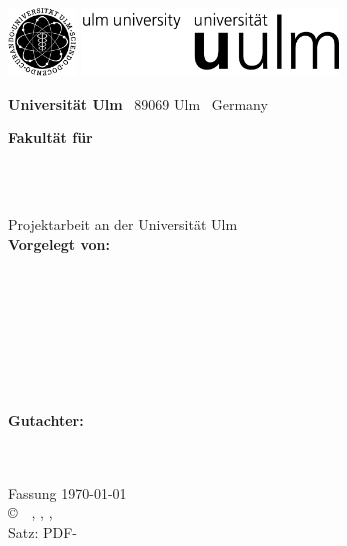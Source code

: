 \frontmatter

\thispagestyle{empty}
\begin{addmargin*}[4mm]{-1mm}
	
	\includegraphics[height=1.8cm]{images/unilogo_bild}
	\hspace*{52.5mm}
	\includegraphics[height=1.8cm]{images/unilogo_wort}\\[1em]
	
	{\footnotesize
		{\bfseries Universität Ulm} \textbar ~89069 Ulm \textbar ~Germany
		\hspace*{57mm}\parbox[t]{36mm}{\bfseries Fakultät für 
			\fakultaet\\
			\mdseries \institut}\\[2cm]
		
		\parbox{143mm}{\bfseries \LARGE \titel}\\[2em]
		{\footnotesize Projektarbeit an der Universität Ulm}\\[2em]
		{\footnotesize \bfseries Vorgelegt von:}\\
		{\footnotesize \fullnameA\\ \emailA}\\[1em]
		{\footnotesize \fullnameB\\ \emailB}\\[1em]
		{\footnotesize \fullnameC\\ \emailC}\\[1em]
		{\footnotesize \fullnameD\\ \emailD}\\[2em]
		{\footnotesize \bfseries Gutachter:}\\                     
		{\footnotesize \gutachterA}\\\\
		{\footnotesize \jahr}
	}
\end{addmargin*}


\clearpage
\thispagestyle{empty}
{ \small
	\flushleft
	Fassung \today \\\vfill
	\copyright~\jahr~\fullnameA, \fullnameB, \fullnameC, \fullnameD\\[0.5em]
	Satz: PDF-\LaTeXe
}
